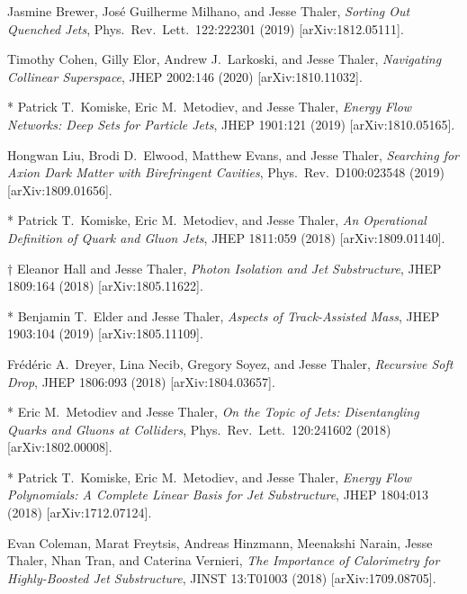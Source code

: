 \begin{list}{[]\addtocounter{jessecount}{-1}}{\leftmargin=3em \itemsep=4pt}
\item
 Jasmine Brewer, José Guilherme Milhano, and Jesse Thaler,
\emph{Sorting Out Quenched Jets},
Phys.\ Rev.\ Lett.\ 122:222301 (2019)
[arXiv:1812.05111].

\item
 Timothy Cohen, Gilly Elor, Andrew J.\ Larkoski, and Jesse Thaler,
\emph{Navigating Collinear Superspace},
JHEP 2002:146 (2020)
[arXiv:1810.11032].

\item
* Patrick T.\ Komiske, Eric M.\ Metodiev, and Jesse Thaler,
\emph{Energy Flow Networks: Deep Sets for Particle Jets},
JHEP 1901:121 (2019)
[arXiv:1810.05165].

\item
 Hongwan Liu, Brodi D.\ Elwood, Matthew Evans, and Jesse Thaler,
\emph{Searching for Axion Dark Matter with Birefringent Cavities},
Phys.\ Rev.\ D100:023548 (2019)
[arXiv:1809.01656].

\item
* Patrick T.\ Komiske, Eric M.\ Metodiev, and Jesse Thaler,
\emph{An Operational Definition of Quark and Gluon Jets},
JHEP 1811:059 (2018)
[arXiv:1809.01140].

\item
$\dagger$ Eleanor Hall and Jesse Thaler,
\emph{Photon Isolation and Jet Substructure},
JHEP 1809:164 (2018)
[arXiv:1805.11622].

\item
* Benjamin T.\ Elder and Jesse Thaler,
\emph{Aspects of Track-Assisted Mass},
JHEP 1903:104 (2019)
[arXiv:1805.11109].

\item
 Frédéric A.\ Dreyer, Lina Necib, Gregory Soyez, and Jesse Thaler,
\emph{Recursive Soft Drop},
JHEP 1806:093 (2018)
[arXiv:1804.03657].

\item
* Eric M.\ Metodiev and Jesse Thaler,
\emph{On the Topic of Jets: Disentangling Quarks and Gluons at Colliders},
Phys.\ Rev.\ Lett.\ 120:241602 (2018)
[arXiv:1802.00008].

\item
* Patrick T.\ Komiske, Eric M.\ Metodiev, and Jesse Thaler,
\emph{Energy Flow Polynomials: A Complete Linear Basis for Jet Substructure},
JHEP 1804:013 (2018)
[arXiv:1712.07124].

\item
 Evan Coleman, Marat Freytsis, Andreas Hinzmann, Meenakshi Narain, Jesse Thaler, Nhan Tran, and Caterina Vernieri,
\emph{The Importance of Calorimetry for Highly-Boosted Jet Substructure},
JINST 13:T01003 (2018)
[arXiv:1709.08705].


\end{list}

